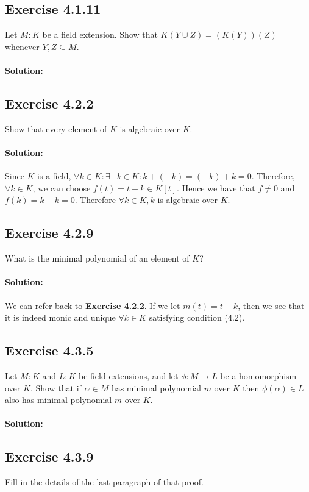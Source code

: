 \documentclass{article}
\begin{document}
\subsection*{Exercise 4.1.11}
Let $M:K$ be a field extension. Show that $K(Y \cup Z) = (K(Y))(Z)$ whenever $Y,Z \subseteq M$. 
\\\\
\textbf{Solution:}

\subsection*{Exercise 4.2.2}
Show that every element of $K$ is algebraic over $K$.
\paragraph{Solution:}
Since $K$ is a field, $\forall k \in K: \exists -k \in K: k + (-k) = (-k) + k = 0$.
Therefore, $\forall k \in K$, we can choose $f(t) = t - k \in K[t]$. Hence we have that $f \neq 0$
and $f(k) = k - k = 0$. Therefore $\forall k \in K, k$ is algebraic over $K$.


\subsection*{Exercise 4.2.9}
What is the minimal polynomial of an element of $K$?
\paragraph{Solution:}
We can refer back to \textbf{Exercise 4.2.2}.
If we let $m(t) = t - k$, then we see that it is indeed monic and unique $\forall k \in K$ satisfying condition (4.2).

\subsection*{Exercise 4.3.5}
Let $M:K$ and $L:K$ be field extensions, and let $\phi: M \rightarrow L$ be a homomorphism over $K$. Show that if $\alpha \in M$ has
minimal polynomial $m$ over $K$ then $\phi(\alpha) \in L$ also has minimal polynomial $m$ over $K$.
\\\\
\textbf{Solution:}

\subsection*{Exercise 4.3.9}
Fill in the details of the last paragraph of that proof.
\end{document}
